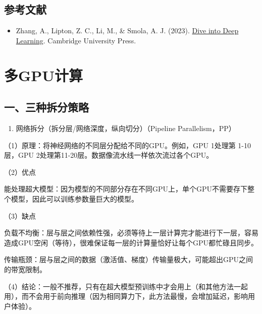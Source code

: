 \hypertarget{ux53c2ux8003ux6587ux732e-35}{%
\subsection{参考文献}\label{ux53c2ux8003ux6587ux732e-35}}

\vspace{0.25em}
\begin{itemize}
\tightlist
\item
  Zhang, A., Lipton, Z. C., Li, M., \& Smola, A. J. (2023). \href{https://D2L.ai}{Dive into Deep Learning}. Cambridge University Press.
\end{itemize}

\clearpage

\hypertarget{ux591agpuux8ba1ux7b97}{%
\section{多GPU计算}\label{ux591agpuux8ba1ux7b97}}

\hypertarget{ux4e00ux4e09ux79cdux62c6ux5206ux7b56ux7565}{%
\subsection{一、三种拆分策略}\label{ux4e00ux4e09ux79cdux62c6ux5206ux7b56ux7565}}

\begin{enumerate}
\def\labelenumi{\arabic{enumi}.}
\tightlist
\item
  网络拆分（拆分层/网络深度，纵向切分）（Pipeline Parallelism，PP）
\end{enumerate}

（1）原理：将神经网络的不同层分配给不同的GPU。例如，GPU 1处理第 1-10 层，GPU 2处理第11-20层。数据像流水线一样依次流过各个GPU。

（2）优点

能处理超大模型：因为模型的不同部分存在不同GPU上，单个GPU不需要存下整个模型，因此可以训练参数量巨大的模型。

（3）缺点

负载不均衡：层与层之间依赖性强，必须等待上一层计算完才能进行下一层，容易造成GPU空闲（等待），很难保证每一层的计算量恰好让每个GPU都忙碌且同步。

传输瓶颈：层与层之间的数据（激活值、梯度）传输量极大，可能超出GPU之间的带宽限制。

（4）结论：一般不推荐，只有在超大模型预训练中才会用上（和其他方法一起用），而不会用于前向推理（因为相同算力下，此方法最慢，会增加延迟，影响用户体验）。

